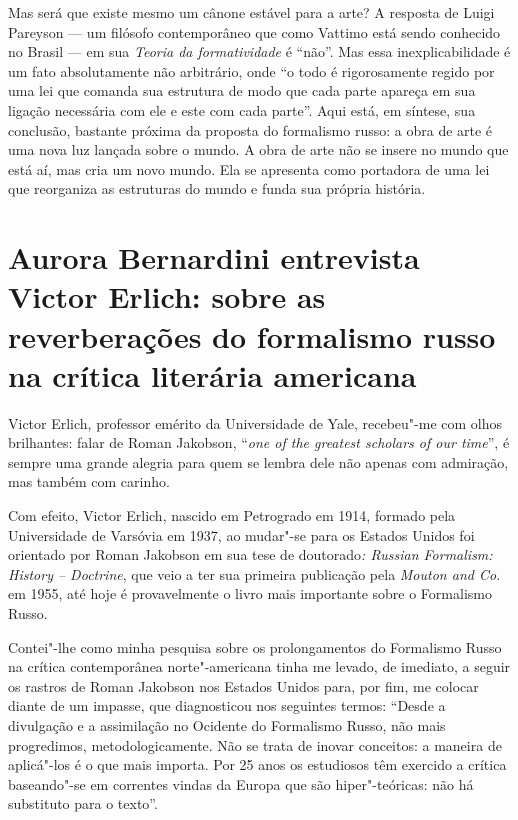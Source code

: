 Mas será que existe mesmo um cânone estável para a arte? A resposta de
Luigi Pareyson --- um filósofo contemporâneo que como Vattimo está sendo
conhecido no Brasil --- em sua \emph{Teoria da formatividade} é ``não''. Mas essa inexplicabilidade é
um fato absolutamente não arbitrário, onde ``o todo é rigorosamente
regido por uma lei que comanda sua estrutura de modo que cada parte
apareça em sua ligação necessária com ele e este com cada parte''. Aqui
está, em síntese, sua conclusão, bastante próxima da proposta do
formalismo russo: a obra de arte é uma nova luz lançada sobre o mundo. A
obra de arte não se insere no mundo que está aí, mas cria um novo mundo.
Ela se apresenta como portadora de uma lei que reorganiza as estruturas
do mundo e funda sua própria história.

\chapter*{Aurora Bernardini entrevista Victor Erlich: sobre as reverberações do formalismo russo na crítica literária americana}


Victor Erlich, professor emérito da Universidade de Yale, recebeu"-me com
olhos brilhantes: falar de Roman Jakobson, ``\emph{one of the greatest
scholars of our time}'', é sempre uma grande alegria para quem se lembra
dele não apenas com admiração, mas também com carinho.

Com efeito, Victor Erlich, nascido em Petrogrado em 1914, formado pela
Universidade de Varsóvia em 1937, ao mudar"-se para os Estados Unidos foi
orientado por Roman Jakobson em sua tese de doutorado\emph{: Russian
Formalism: History -- Doctrine}, que veio a ter sua primeira publicação
pela \emph{Mouton and Co.} em 1955, até hoje é provavelmente o livro
mais importante sobre o Formalismo Russo.

Contei"-lhe como minha pesquisa sobre os prolongamentos do Formalismo
Russo na crítica contemporânea norte"-americana tinha me levado, de
imediato, a seguir os rastros de Roman Jakobson nos Estados Unidos para,
por fim, me colocar diante de um impasse, que diagnosticou nos seguintes
termos: ``Desde a divulgação e a assimilação no Ocidente do Formalismo
Russo, não mais progredimos, metodologicamente. Não se trata de inovar
conceitos: a maneira de aplicá"-los é o que mais importa. Por 25 anos os
estudiosos têm exercido a crítica baseando"-se em correntes vindas da
Europa que são hiper"-teóricas: não há substituto para o texto''.

